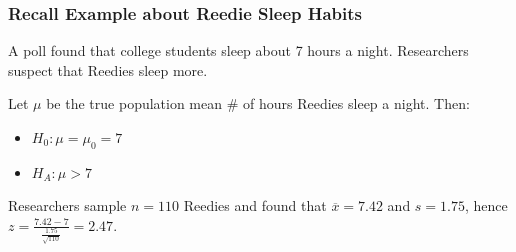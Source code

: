 \documentclass[handout]{beamer}
\newcommand{\blue}[1]{\textcolor{blue2}{#1}}
\newcommand{\xbar}{\overline{x}}
\begin{document}
\begin{frame}
\frametitle{Recall Example about Reedie Sleep Habits}
A poll found that college students sleep about 7 hours a night.  Researchers suspect that Reedies sleep more.

\vspace{0.5cm}

Let $\mu$ be the true \blue{population mean} \# of hours Reedies sleep a night.  Then:
\begin{itemize}
\item $H_0: \mu = \mu_0= 7$
\item $H_A: \mu > 7$
\end{itemize}

\vspace{0.5cm}

Researchers sample $n=110$ Reedies and found that $\xbar = 7.42$ and $s=1.75$, hence $z=\frac{7.42 - 7}{\frac{1.75}{\sqrt{110}}} = 2.47$.

\end{frame}


%
%
%
%
%
%



%
%
%
%
\end{document}
